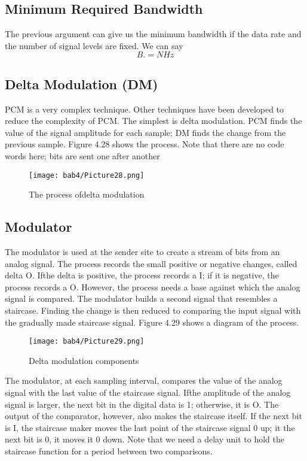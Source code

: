 \subsection*{Minimum Required Bandwidth}
The previous argument can give us the minimum bandwidth if the data rate and the number of signal levels are fixed. We can say
\begin{equation}
  B . = N Hz
\end{equation}

\subsection{Delta Modulation (DM)}
PCM is a very complex technique. Other techniques have been developed to reduce the complexity of PCM. The simplest is delta modulation. PCM finds the value of the signal amplitude for each sample; DM finds the change from the previous sample. Figure 4.28 shows the process. Note that there are no code words here; bits are sent one after another

\begin{figure}
  \centering
  \texttt{[image: bab4/Picture28.png]}
  \caption{The process ofdelta modulation}
  \label{fig4:28}
\end{figure}

\subsection*{Modulator}
The modulator is used at the sender site to create a stream of bits from an analog signal. The process records the small positive or negative changes, called delta O. Ifthe delta is positive, the process records a I; if it is negative, the process records a O. However, the process needs a base against which the analog signal is compared. The modulator builds a second signal that resembles a staircase. Finding the change is then reduced to comparing the input signal with the gradually made staircase signal. Figure 4.29 shows a diagram of the process.

\begin{figure}
  \centering
  \texttt{[image: bab4/Picture29.png]}
  \caption{Delta modulation components}
  \label{fig4:29}
\end{figure}

The modulator, at each sampling interval, compares the value of the analog signal with the last value of the staircase signal. Ifthe amplitude of the analog signal is larger, the next bit in the digital data is 1; otherwise, it is O. The output of the comparator, however, also makes the staircase itself. If the next bit is I, the staircase maker moves the last point of the staircase signal 0 up; it the next bit is 0, it moves it 0 down. Note that we need a delay unit to hold the staircase function for a period between two comparisons.


